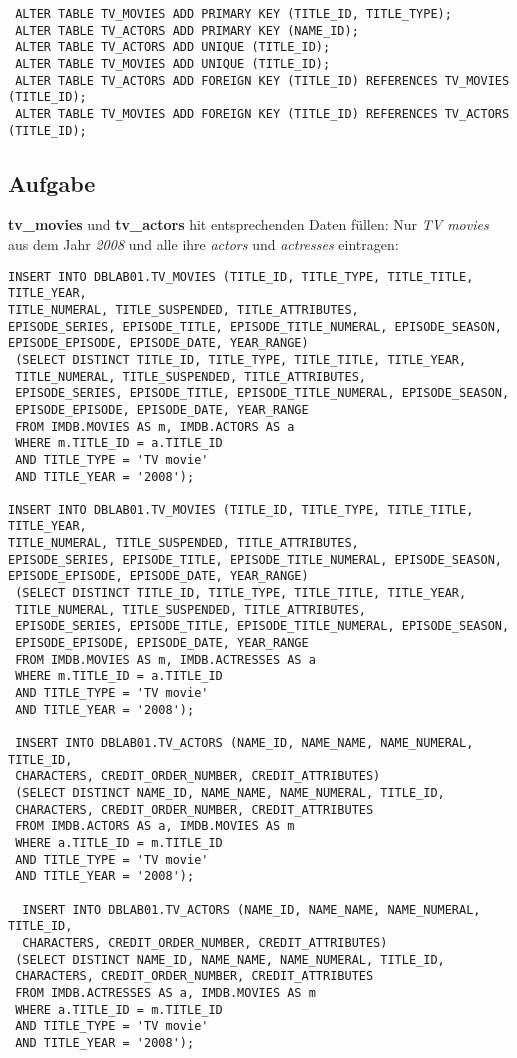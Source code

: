 \documentclass[11pt,a4paper,DIV=9]{scrartcl}
\newcounter{temp}
\newcommand{\aufgabe}[1]{
  \setcounter{temp}{\value{subsection}}
  \setcounter{subsection}{#1}
  \addtocounter{subsection}{-1}
  \subsection{Aufgabe}
  \setcounter{subsection}{\value{temp}}
}
\begin{document}
 \begin{lstlisting}
 ALTER TABLE TV_MOVIES ADD PRIMARY KEY (TITLE_ID, TITLE_TYPE);
 ALTER TABLE TV_ACTORS ADD PRIMARY KEY (NAME_ID); 
 ALTER TABLE TV_ACTORS ADD UNIQUE (TITLE_ID);
 ALTER TABLE TV_MOVIES ADD UNIQUE (TITLE_ID);
 ALTER TABLE TV_ACTORS ADD FOREIGN KEY (TITLE_ID) REFERENCES TV_MOVIES (TITLE_ID);
 ALTER TABLE TV_MOVIES ADD FOREIGN KEY (TITLE_ID) REFERENCES TV_ACTORS (TITLE_ID);
 \end{lstlisting}
 \aufgabe{6}
 \textbf{tv\_movies} und \textbf{tv\_actors} hit entsprechenden Daten f\"ullen:
 Nur \textit{TV movies} aus dem Jahr \textit{2008} und alle ihre \textit{actors} und \textit{actresses} eintragen:
 \begin{lstlisting}
INSERT INTO DBLAB01.TV_MOVIES (TITLE_ID, TITLE_TYPE, TITLE_TITLE, TITLE_YEAR, 
TITLE_NUMERAL, TITLE_SUSPENDED, TITLE_ATTRIBUTES, 
EPISODE_SERIES, EPISODE_TITLE, EPISODE_TITLE_NUMERAL, EPISODE_SEASON, 
EPISODE_EPISODE, EPISODE_DATE, YEAR_RANGE)
 (SELECT DISTINCT TITLE_ID, TITLE_TYPE, TITLE_TITLE, TITLE_YEAR, 
 TITLE_NUMERAL, TITLE_SUSPENDED, TITLE_ATTRIBUTES, 
 EPISODE_SERIES, EPISODE_TITLE, EPISODE_TITLE_NUMERAL, EPISODE_SEASON, 
 EPISODE_EPISODE, EPISODE_DATE, YEAR_RANGE
 FROM IMDB.MOVIES AS m, IMDB.ACTORS AS a
 WHERE m.TITLE_ID = a.TITLE_ID
 AND TITLE_TYPE = 'TV movie'
 AND TITLE_YEAR = '2008');
 
INSERT INTO DBLAB01.TV_MOVIES (TITLE_ID, TITLE_TYPE, TITLE_TITLE, TITLE_YEAR, 
TITLE_NUMERAL, TITLE_SUSPENDED, TITLE_ATTRIBUTES, 
EPISODE_SERIES, EPISODE_TITLE, EPISODE_TITLE_NUMERAL, EPISODE_SEASON, 
EPISODE_EPISODE, EPISODE_DATE, YEAR_RANGE)
 (SELECT DISTINCT TITLE_ID, TITLE_TYPE, TITLE_TITLE, TITLE_YEAR, 
 TITLE_NUMERAL, TITLE_SUSPENDED, TITLE_ATTRIBUTES, 
 EPISODE_SERIES, EPISODE_TITLE, EPISODE_TITLE_NUMERAL, EPISODE_SEASON, 
 EPISODE_EPISODE, EPISODE_DATE, YEAR_RANGE
 FROM IMDB.MOVIES AS m, IMDB.ACTRESSES AS a
 WHERE m.TITLE_ID = a.TITLE_ID
 AND TITLE_TYPE = 'TV movie'
 AND TITLE_YEAR = '2008');
 
 INSERT INTO DBLAB01.TV_ACTORS (NAME_ID, NAME_NAME, NAME_NUMERAL, TITLE_ID, 
 CHARACTERS, CREDIT_ORDER_NUMBER, CREDIT_ATTRIBUTES)
 (SELECT DISTINCT NAME_ID, NAME_NAME, NAME_NUMERAL, TITLE_ID, 
 CHARACTERS, CREDIT_ORDER_NUMBER, CREDIT_ATTRIBUTES
 FROM IMDB.ACTORS AS a, IMDB.MOVIES AS m
 WHERE a.TITLE_ID = m.TITLE_ID
 AND TITLE_TYPE = 'TV movie'
 AND TITLE_YEAR = '2008');
 
  INSERT INTO DBLAB01.TV_ACTORS (NAME_ID, NAME_NAME, NAME_NUMERAL, TITLE_ID, 
  CHARACTERS, CREDIT_ORDER_NUMBER, CREDIT_ATTRIBUTES)
 (SELECT DISTINCT NAME_ID, NAME_NAME, NAME_NUMERAL, TITLE_ID, 
 CHARACTERS, CREDIT_ORDER_NUMBER, CREDIT_ATTRIBUTES
 FROM IMDB.ACTRESSES AS a, IMDB.MOVIES AS m
 WHERE a.TITLE_ID = m.TITLE_ID
 AND TITLE_TYPE = 'TV movie'
 AND TITLE_YEAR = '2008');
 
 \end{lstlisting}
\end{document}
